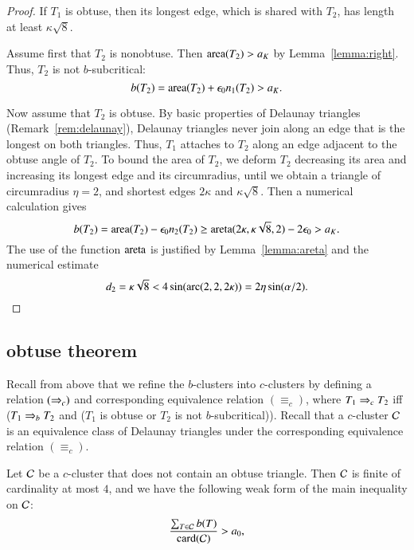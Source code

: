 \begin{proof} 
  If $T_1$ is obtuse, then its longest edge, which is shared with
  $T_2$, has length at least $\kappa\sqrt8$.

  Assume first that $T_2$ is nonobtuse.  Then ${\operatorname{area}}(T_2) > a_K$ by
  Lemma~\ref{lemma:right}.  Thus, $T_2$ is not $b$-subcritical:
\[
b(T_2) = {\operatorname{area}}(T_2) + \epsilon_0 n_1(T_2) > a_K.
\]

Now assume that $T_2$ is obtuse.  By basic properties of Delaunay
triangles (Remark~\ref{rem:delaunay}), Delaunay triangles never join
along an edge that is the longest on both triangles.  Thus, $T_1$
attaches to $T_2$ along an edge adjacent to the obtuse angle of $T_2$.
To bound the area of $T_2$, we deform $T_2$ decreasing its area and
increasing its longest edge and its circumradius, until we obtain a
triangle of circumradius $\eta=2$, and shortest edges $2\kappa$ and
$\kappa\sqrt{8}$.  Then a numerical calculation gives
\[
b(T_2) = {\operatorname{area}}(T_2) - \epsilon_0 n_2(T_2) \ge 
{\operatorname{areta}}(2\kappa,\kappa\sqrt{8},2) - 2\epsilon_0 > a_K.
\] %
The use of the function ${\operatorname{areta}}$ is justified by
Lemma~\ref{lemma:areta} and the numerical estimate
\[
d_2 = \kappa\sqrt8 <  4 \sin(\operatorname{arc}(2,2,2\kappa)) = 2\eta\sin(\alpha/2).
\] %
\end{proof}

\subsection{obtuse theorem}

Recall from above that we refine the $b$-clusters into $c$-clusters by
defining a relation $(\Rightarrow_{c})$ and corresponding equivalence relation
$(\equiv_c)$, where $T_1 \Rightarrow_{c} T_2$ iff ($T_1 \Rightarrow_{b} T_2$ and ($T_1$
is obtuse or $T_2$ is not $b$-subcritical)).  Recall that a
$c$-cluster $\mathcal C$ is an equivalence class of Delaunay triangles under
the corresponding equivalence relation $(\equiv_c)$.

\begin{lemma}\label{lemma:c-weak}
  Let $\mathcal C$ be a $c$-cluster that does not contain an obtuse triangle.
  Then $\mathcal C$ is finite of cardinality at most $4$,
  and we have the following weak form of the main
  inequality on $\mathcal C$:
\[
\frac{\sum_{T\in \mathcal C} b(T)}{{\operatorname{card}}(\mathcal C)} > a_0,
\]
\end{lemma}

